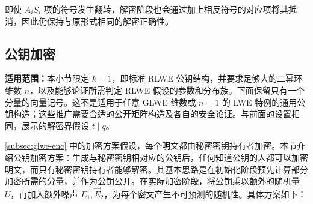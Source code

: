 即使 $A_iS_i$ 项的符号发生翻转，解密阶段也会通过加上相反符号的对应项将其抵消，因此仍保持与原形式相同的解密正确性。





\subsection{公钥加密}
\label{subsec:glwe-public-key-enc}

\textbf{适用范围：}本小节限定 $k=1$，即标准 RLWE 公钥结构，并要求足够大的二幂环维数 $n$，以及能够论证所需判定 RLWE 假设的参数和分布族。下面保留只有一个分量的向量记号。这不是适用于任意 GLWE 维数或 $n=1$ 的 LWE 特例的通用公钥构造；这些推广需要合适的公开矩阵构造及各自的安全论证。与前面的设置相同，展示的解密界假设 $t\mid q$。


\autoref{subsec:glwe-enc} 中的加密方案假设，每个明文都由秘密密钥持有者加密。本节介绍公钥加密方案：生成与秘密密钥相对应的公钥后，任何知道公钥的人都可以加密明文，而只有秘密密钥持有者能够解密。其基本思路是在初始化阶段预先计算部分加密所需的分量，并作为公钥公开。在实际加密阶段，将公钥乘以额外的随机量 $U$，再加入额外噪声 $E_1, \vec{E}_2$，为每个密文产生不可预测的随机性。具体方案如下：

